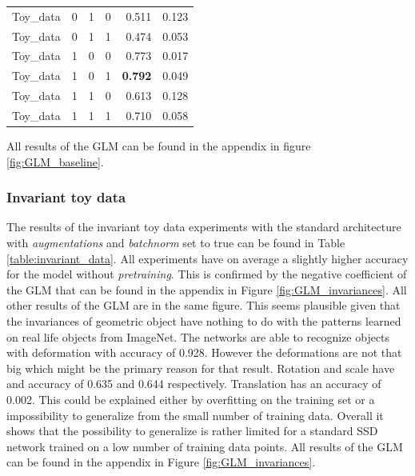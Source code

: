 \begin{table}[!htb]
\begin{tabular}{lrrrrr}
		Toy\_data &              0 &          1 &           0 &  0.511 &    0.123 \\
		Toy\_data &              0 &          1 &           1 &  0.474 &    0.053 \\
		Toy\_data &              1 &          0 &           0 &  0.773 &    0.017 \\
		Toy\_data &              1 &          0 &           1 &  \textbf{0.792} &    0.049 \\
		Toy\_data &              1 &          1 &           0 &  0.613 &    0.128 \\
		Toy\_data &              1 &          1 &           1 &  0.710 &    0.058 \\
		\bottomrule
	\end{tabular}
	\label{table:baseline}
\end{table}

All results of the GLM can be found in the appendix in figure \ref{fig:GLM_baseline}. 


\subsubsection{Invariant toy data}

The results of the invariant toy data experiments with the standard architecture with \textit{augmentations} and \textit{batchnorm} set to true can be found in Table \ref{table:invariant_data}. All experiments have on average a slightly higher accuracy for the model without \textit{pretraining}. This is confirmed by the negative coefficient of the GLM that can be found in the appendix in Figure \ref{fig:GLM_invariances}. All other results of the GLM are in the same figure.  This seems plausible given that the invariances of geometric object have nothing to do with the patterns learned on real life objects from ImageNet. The networks are able to recognize objects with deformation with accuracy of 0.928. However the deformations are not that big which might be the primary reason for that result. Rotation and scale have and accuracy of 0.635 and 0.644 respectively. Translation has an accuracy of 0.002. This could be explained either by overfitting on the training set or a impossibility to generalize from the small number of training data. Overall it shows that the possibility to generalize is rather limited for a standard SSD network trained on a low number of training data points. All results of the GLM can be found in the appendix in Figure \ref{fig:GLM_invariances}. 

